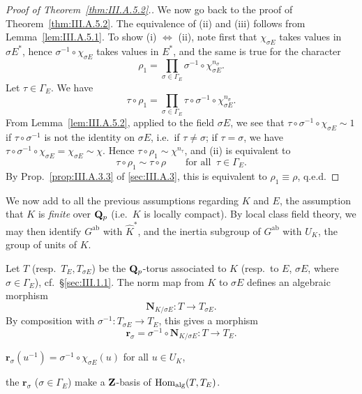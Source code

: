\begin{proof}[Proof of Theorem~\ref{thm:III.A.5.2}.]
We now go back to the proof of Theorem~\ref{thm:III.A.5.2}.  The
equivalence of (ii) and (iii) follows from
Lemma~\ref{lem:III.A.5.1}.  To show (i) $\Longleftrightarrow$ (ii),
note first that $\chi_{\sigma E}$ takes values in $\sigma E^*$, hence
$\sigma^{-1}\circ\chi_{\sigma E}$ takes values in $E^*$, and the same
is true for the character
\[
\rho_1=\prod_{\sigma\in\Gamma_E}
\sigma^{-1}\circ\chi_{\sigma E}^{n_\sigma}.
\]
Let $\tau\in\Gamma_E$.  We have
\[
\tau\circ\rho_1=\prod_{\sigma\in\Gamma_E}
\tau\circ\sigma^{-1}\circ\chi_{\sigma E}^{n_\sigma}.
\]
From Lemma~\ref{lem:III.A.5.2}, applied to the field $\sigma E$, we see
that $\tau\circ\sigma^{-1}\circ\chi_{\sigma E}\sim 1$ if
$\tau\circ\sigma^{-1}$ is not the identity on $\sigma E$, i.e.\ if
$\tau\neq\sigma$; if $\tau=\sigma$, we have
$\tau\circ\sigma^{-1}\circ\chi_{\sigma E}=\chi_{\sigma E}\sim\chi$.
Hence $\tau\circ\rho_1\sim\chi^{n_\tau}$, and (ii) is equivalent to
\[
\tau\circ\rho_1\sim\tau\circ\rho \qquad\text{for all }\
\tau\in\Gamma_E.
\]
By Prop.~\ref{prop:III.A.3.3} of \ref{sec:III.A.3}, this is equivalent
to $\rho_1\equiv\rho$, q.e.d.
\end{proof}


We now add to all the previous assumptions regarding $K$ and $E$, the
assumption that $K$ is \emph{finite} over $\mathbf{Q}_p$ (i.e.\ $K$ is locally
compact).  By local class field theory, we may then identify
$G^{\mathrm{ab}}$ with $\hat K^*$, and the inertia subgroup of
$G^{\mathrm{ab}}$ with $U_K$, the group of units of $K$.

Let $T$ (resp.\ $T_E, T_{\sigma E}$) be the $\mathbf{Q}_p$-torus associated to
$K$ (resp.\ to $E$, $\sigma E$, where $\sigma\in\Gamma_E$),
cf.~\S\ref{sec:III.1.1}.  The norm map from $K$ to $\sigma E$ defines
an algebraic morphism
\[
\mathbf{N}_{K/\sigma E}\colon T\to T_{\sigma E}.
\]
By composition with $\sigma^{-1}\colon T_{\sigma E}\to T_E$, this gives
a morphism
\[
\mathbf{r}_\sigma=\sigma^{-1}\circ\mathbf{N}_{K/\sigma E}\colon
T\to T_E.
\]

\begin{proposition}[5]\label{prop:III.A.6.5}
\begin{alist}
\item $\mathbf{r}_\sigma(u^{-1})=\sigma^{-1}\circ\chi_{\sigma E}(u)$
for all $u\in U_K$,
\item the $\mathbf{r}_\sigma$ ($\sigma\in\Gamma_E$) make a
$\mathbf{Z}$-basis of $\mathrm{Hom}_{\mathrm{alg}}(T,T_E)$.
\end{alist}
\end{proposition}

